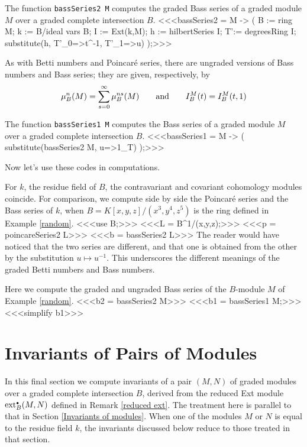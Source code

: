 \begin{sCode}
The function {\tt bassSeries2 M} computes the graded Bass series of a
graded module $M$ over a graded complete intersection $B$.
<<<bassSeries2 = M -> (
   B := ring M;
   k := B/ideal vars B;
   I := Ext(k,M);
   h := hilbertSeries I;
   T':= degreesRing I;
   substitute(h, {T'_0=>t^-1, T'_1=>u})
   );>>>
 \end{sCode}

As with Betti numbers and Poincar\'e series, there are ungraded versions
of Bass numbers and Bass series; they are given, respectively, by
\[
\mu_B^n(M)=\sum_{s=0}^\infty\mu_B^{ns}(M)
\qquad\text{and}\qquad
{I}_B^M(t)={I}_B^M(t,1)
\]

\begin{sCode}
The function {\tt bassSeries1 M} computes the Bass series of a graded
module $M$ over a graded complete intersection $B$.
<<<bassSeries1 = M -> (
   substitute(bassSeries2 M, {u=>1_T})
   );>>>
\end{sCode}

Now let's use these codes in computations.

\begin{sExample}
For $k$, the residue field of $B$, the contravariant and covariant
cohomology modules coincide.  For comparison, we compute side by side
the Poincar\'e series and the Bass series of $k$, when
$B=K[x,y,z]/(x^3,y^4,z^5)$ is the ring defined in Example
\ref{random}.
<<<use B;>>>
<<<L = B^1/(x,y,z);>>>
<<<p = poincareSeries2 L>>>
<<<b = bassSeries2 L>>>
The reader would have noticed that the two series are different, and
that one is obtained from the other by the substitution $u\mapsto
u^{-1}$.  This underscores the different meanings of the graded Betti
numbers and Bass numbers.
 \end{sExample}

\begin{sExample}
Here we compute the graded and ungraded Bass series of the $B$-module
$M$ of Example \ref{random}.
<<<b2 = bassSeries2 M>>>
<<<b1 = bassSeries1 M;>>>
<<<simplify b1>>>
 \end{sExample}

\section{Invariants of Pairs of Modules}
\label{Invariants of pairs of modules}

In this final section we compute invariants of a pair $(M,N)$ of graded
modules over a graded complete intersection $B$, derived from the
reduced Ext module $\operatorname{ext}^{\scriptscriptstyle\bullet}_B(M,N)$ defined in Remark \ref{reduced
ext}.  The treatment here is parallel to that in Section
\ref{Invariants of modules}.  When one of the modules $M$ or $N$ is
equal to the residue field $k$, the invariants discussed below reduce
to those treated in that section.

